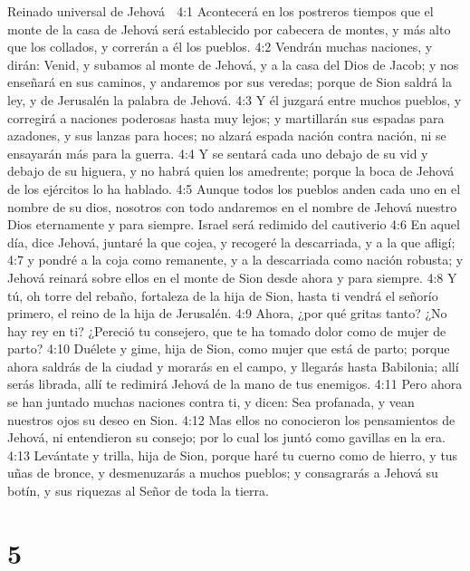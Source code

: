 Reinado universal de Jehová  

4:1 Acontecerá en los postreros tiempos que el monte de la casa de Jehová será establecido por cabecera de montes, y más alto que los collados, y correrán a él los pueblos.  
4:2 Vendrán muchas naciones, y dirán: Venid, y subamos al monte de Jehová, y a la casa del Dios de Jacob; y nos enseñará en sus caminos, y andaremos por sus veredas; porque de Sion saldrá la ley, y de Jerusalén la palabra de Jehová.  
4:3 Y él juzgará entre muchos pueblos, y corregirá a naciones poderosas hasta muy lejos; y martillarán sus espadas para azadones, y sus lanzas para hoces; no alzará espada nación contra nación, ni se ensayarán más para la guerra.  
4:4 Y se sentará cada uno debajo de su vid y debajo de su higuera, y no habrá quien los amedrente; porque la boca de Jehová de los ejércitos lo ha hablado.  
4:5 Aunque todos los pueblos anden cada uno en el nombre de su dios, nosotros con todo andaremos en el nombre de Jehová nuestro Dios eternamente y para siempre.  
Israel será redimido del cautiverio  
4:6 En aquel día, dice Jehová, juntaré la que cojea, y recogeré la descarriada, y a la que afligí;  
4:7 y pondré a la coja como remanente, y a la descarriada como nación robusta; y Jehová reinará sobre ellos en el monte de Sion desde ahora y para siempre.  
4:8 Y tú, oh torre del rebaño, fortaleza de la hija de Sion, hasta ti vendrá el señorío primero, el reino de la hija de Jerusalén.  
4:9 Ahora, ¿por qué gritas tanto? ¿No hay rey en ti? ¿Pereció tu consejero, que te ha tomado dolor como de mujer de parto?  
4:10 Duélete y gime, hija de Sion, como mujer que está de parto; porque ahora saldrás de la ciudad y morarás en el campo, y llegarás hasta Babilonia; allí serás librada, allí te redimirá Jehová de la mano de tus enemigos.  
4:11 Pero ahora se han juntado muchas naciones contra ti, y dicen: Sea profanada, y vean nuestros ojos su deseo en Sion.  
4:12 Mas ellos no conocieron los pensamientos de Jehová, ni entendieron su consejo; por lo cual los juntó como gavillas en la era.  
4:13 Levántate y trilla, hija de Sion, porque haré tu cuerno como de hierro, y tus uñas de bronce, y desmenuzarás a muchos pueblos; y consagrarás a Jehová su botín, y sus riquezas al Señor de toda la tierra.  

\chapter{5}

